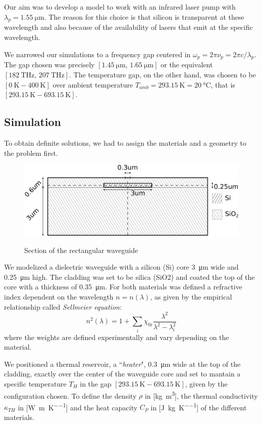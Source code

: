 \documentclass[12pt,a4paper,twoside]{article}
\begin{document}
Our aim was to develop a model to work with an infrared laser pump with $\lambda_{p} = \SI{1.55}{\um}$.
The reason for this choice is that silicon is transparent at these wavelength and also because of the availability of lasers that emit at the specific wavelength.

We narrowed our simulations to a frequency gap centered in $\omega_p = 2\pi \nu_p = 2\pi c / \lambda_{p}$.
The gap chosen was precisely $[\SI{1.45}{\um} ,\, \SI{1.65}{\um}]$ or the equivalent $[\SI{182}{\THz} ,\, \SI{207}{\THz}]$.
The temperature gap, on the other hand, was chosen to be $[\SI{0}{\K} - \SI{400}{\K}]$ over ambient temperature $T_{amb} = \SI{293.15}{\K} = \SI{20}{\celsius}$, that is $[\SI{293.15}{\K} - \SI{693.15}{\K}]$.

\subsection{Simulation}
To obtain definite solutions, we had to assign the materials and a geometry to the problem first.

\begin{figure}[ht]
	\centering
	\includegraphics[width=1\textwidth]{geometry.pdf}
	\label{fig_wg_Section}
	\caption{Section of the rectangular waveguide}
\end{figure}

We modelized a dielectric waveguide with a silicon (Si) core \SI{3}{\um} wide and \SI{.25}{\um} high.
The cladding was set to be silica (SiO2) and coated the top of the core with a thickness of \SI{.35}{\um}.
For both materials was defined a refractive index dependent on the wavelength $n=n(\lambda)$, as given by the empirical relationship called \textit{Sellmeier equation}:
\begin{equation}
	n^2(\lambda) = 1+ \sum_i \chi_{0i}\frac{\lambda^2}{\lambda^2-\lambda^2_i}
	\label{eq_sellmeier}
\end{equation}
where the weights are defined experimentally and vary depending on the material.

We positioned a thermal reservoir, a ``\textit{heater}", \SI{0.3}{\um} wide at the top of the cladding, exactly over the center of the waveguide core and set to mantain a specific temperature $T_H$ in the gap $[\SI{293.15}{\K} - \SI{693.15}{\K}]$, given by the configuration chosen.
To 
define the density $\rho$ in [\si{\kg\m^3}], the thermal conductivity $\kappa_{TH}$ in [\si{\W\per\m\per\K}] and the heat capacity $C_P$ in [\si{\J\per\kg\per\K}] of the different materials.
\end{document}
